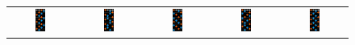 \documentclass[10pt]{sigplanconf}
\begin{document}
\begin{figure}[t]
	\begin{center}
	\begin{tabular}{ccccc}
		\includegraphics[width=0.17\textwidth]{result-1-3-vanilla.png} &
		\includegraphics[width=0.17\textwidth]{result-1-5-xover.png} &
		\includegraphics[width=0.17\textwidth]{result-1-6-lats.png} &
		\includegraphics[width=0.17\textwidth]{result-irregular-270.png} &
		\includegraphics[width=0.17\textwidth]{result-2-spin.png} \\

\end{tabular}
\end{center}
\end{figure}
\end{document}
